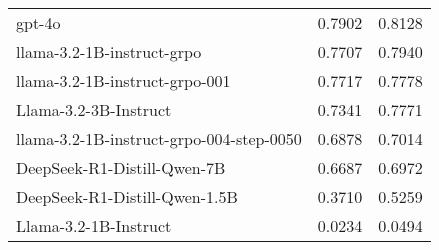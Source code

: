 \begin{tabular}{lrr}
gpt-4o & 0.7902 & 0.8128 \\
llama-3.2-1B-instruct-grpo & 0.7707 & 0.7940 \\
llama-3.2-1B-instruct-grpo-001 & 0.7717 & 0.7778 \\
Llama-3.2-3B-Instruct & 0.7341 & 0.7771 \\
llama-3.2-1B-instruct-grpo-004-step-0050 & 0.6878 & 0.7014 \\
DeepSeek-R1-Distill-Qwen-7B & 0.6687 & 0.6972 \\
DeepSeek-R1-Distill-Qwen-1.5B & 0.3710 & 0.5259 \\
Llama-3.2-1B-Instruct & 0.0234 & 0.0494 \\
\bottomrule
\end{tabular}
